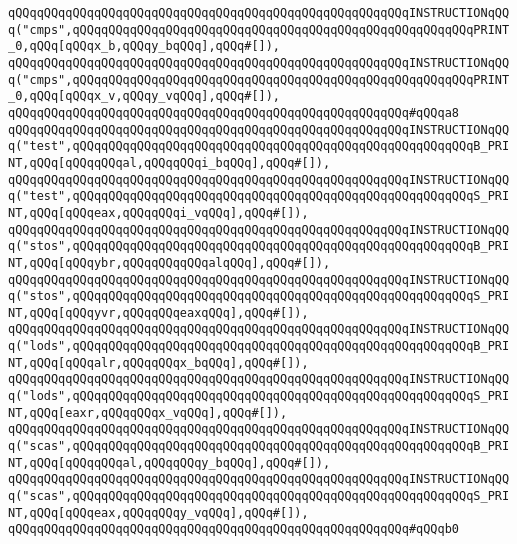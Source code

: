 \verb|qQQqqQQqqQQqqQQqqQQqqQQqqQQqqQQqqQQqqQQqqQQqqQQqqQQqqQQqINSTRUCTIONqQQq("cmps",qQQqqQQqqQQqqQQqqQQqqQQqqQQqqQQqqQQqqQQqqQQqqQQqqQQqqQQqPRINT_0,qQQq[qQQqx_b,qQQqy_bqQQq],qQQq#[]),|\newline
\verb|qQQqqQQqqQQqqQQqqQQqqQQqqQQqqQQqqQQqqQQqqQQqqQQqqQQqqQQqINSTRUCTIONqQQq("cmps",qQQqqQQqqQQqqQQqqQQqqQQqqQQqqQQqqQQqqQQqqQQqqQQqqQQqqQQqPRINT_0,qQQq[qQQqx_v,qQQqy_vqQQq],qQQq#[]),|\newline
\verb|qQQqqQQqqQQqqQQqqQQqqQQqqQQqqQQqqQQqqQQqqQQqqQQqqQQqqQQq#qQQqa8|\newline
\verb|qQQqqQQqqQQqqQQqqQQqqQQqqQQqqQQqqQQqqQQqqQQqqQQqqQQqqQQqINSTRUCTIONqQQq("test",qQQqqQQqqQQqqQQqqQQqqQQqqQQqqQQqqQQqqQQqqQQqqQQqqQQqqQQqB_PRINT,qQQq[qQQqqQQqal,qQQqqQQqi_bqQQq],qQQq#[]),|\newline
\verb|qQQqqQQqqQQqqQQqqQQqqQQqqQQqqQQqqQQqqQQqqQQqqQQqqQQqqQQqINSTRUCTIONqQQq("test",qQQqqQQqqQQqqQQqqQQqqQQqqQQqqQQqqQQqqQQqqQQqqQQqqQQqqQQqS_PRINT,qQQq[qQQqeax,qQQqqQQqi_vqQQq],qQQq#[]),|\newline
\verb|qQQqqQQqqQQqqQQqqQQqqQQqqQQqqQQqqQQqqQQqqQQqqQQqqQQqqQQqINSTRUCTIONqQQq("stos",qQQqqQQqqQQqqQQqqQQqqQQqqQQqqQQqqQQqqQQqqQQqqQQqqQQqqQQqB_PRINT,qQQq[qQQqybr,qQQqqQQqqQQqalqQQq],qQQq#[]),|\newline
\verb|qQQqqQQqqQQqqQQqqQQqqQQqqQQqqQQqqQQqqQQqqQQqqQQqqQQqqQQqINSTRUCTIONqQQq("stos",qQQqqQQqqQQqqQQqqQQqqQQqqQQqqQQqqQQqqQQqqQQqqQQqqQQqqQQqS_PRINT,qQQq[qQQqyvr,qQQqqQQqeaxqQQq],qQQq#[]),|\newline
\verb|qQQqqQQqqQQqqQQqqQQqqQQqqQQqqQQqqQQqqQQqqQQqqQQqqQQqqQQqINSTRUCTIONqQQq("lods",qQQqqQQqqQQqqQQqqQQqqQQqqQQqqQQqqQQqqQQqqQQqqQQqqQQqqQQqB_PRINT,qQQq[qQQqalr,qQQqqQQqx_bqQQq],qQQq#[]),|\newline
\verb|qQQqqQQqqQQqqQQqqQQqqQQqqQQqqQQqqQQqqQQqqQQqqQQqqQQqqQQqINSTRUCTIONqQQq("lods",qQQqqQQqqQQqqQQqqQQqqQQqqQQqqQQqqQQqqQQqqQQqqQQqqQQqqQQqS_PRINT,qQQq[eaxr,qQQqqQQqx_vqQQq],qQQq#[]),|\newline
\verb|qQQqqQQqqQQqqQQqqQQqqQQqqQQqqQQqqQQqqQQqqQQqqQQqqQQqqQQqINSTRUCTIONqQQq("scas",qQQqqQQqqQQqqQQqqQQqqQQqqQQqqQQqqQQqqQQqqQQqqQQqqQQqqQQqB_PRINT,qQQq[qQQqqQQqal,qQQqqQQqy_bqQQq],qQQq#[]),|\newline
\verb|qQQqqQQqqQQqqQQqqQQqqQQqqQQqqQQqqQQqqQQqqQQqqQQqqQQqqQQqINSTRUCTIONqQQq("scas",qQQqqQQqqQQqqQQqqQQqqQQqqQQqqQQqqQQqqQQqqQQqqQQqqQQqqQQqS_PRINT,qQQq[qQQqeax,qQQqqQQqy_vqQQq],qQQq#[]),|\newline
\verb|qQQqqQQqqQQqqQQqqQQqqQQqqQQqqQQqqQQqqQQqqQQqqQQqqQQqqQQq#qQQqb0|\newline
